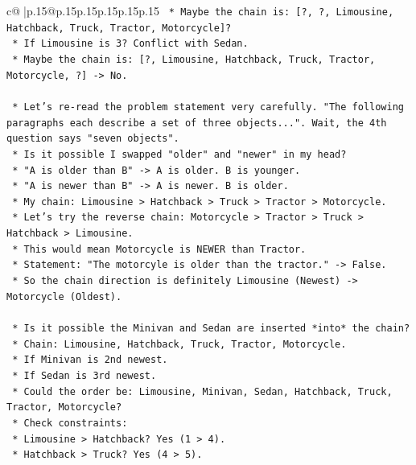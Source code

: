 \documentclass{article}
\begin{document}
{\begin{supertabular}{c@{$\;$}|p{.15\linewidth}@{}p{.15\linewidth}p{.15\linewidth}p{.15\linewidth}p{.15\linewidth}p{.15\linewidth}}
{{{\texttt{        *   Maybe the chain is: {[}?, ?, Limousine, Hatchback, Truck, Tractor, Motorcycle{]}?} \\
\texttt{            *   If Limousine is 3? Conflict with Sedan.} \\
\texttt{        *   Maybe the chain is: {[}?, Limousine, Hatchback, Truck, Tractor, Motorcycle, ?{]} {-}> No.} \\
\\ 
\texttt{    *   Let's re{-}read the problem statement very carefully. "The following paragraphs each describe a set of three objects...". Wait, the 4th question says "seven objects".} \\
\texttt{    *   Is it possible I swapped "older" and "newer" in my head?} \\
\texttt{        *   "A is older than B" {-}> A is older. B is younger.} \\
\texttt{        *   "A is newer than B" {-}> A is newer. B is older.} \\
\texttt{        *   My chain: Limousine > Hatchback > Truck > Tractor > Motorcycle.} \\
\texttt{        *   Let's try the reverse chain: Motorcycle > Tractor > Truck > Hatchback > Limousine.} \\
\texttt{            *   This would mean Motorcycle is NEWER than Tractor.} \\
\texttt{            *   Statement: "The motorcyle is older than the tractor." {-}> False.} \\
\texttt{            *   So the chain direction is definitely Limousine (Newest) {-}> Motorcycle (Oldest).} \\
\\ 
\texttt{    *   Is it possible the Minivan and Sedan are inserted *into* the chain?} \\
\texttt{        *   Chain: Limousine, Hatchback, Truck, Tractor, Motorcycle.} \\
\texttt{        *   If Minivan is 2nd newest.} \\
\texttt{        *   If Sedan is 3rd newest.} \\
\texttt{        *   Could the order be: Limousine, Minivan, Sedan, Hatchback, Truck, Tractor, Motorcycle?} \\
\texttt{            *   Check constraints:} \\
\texttt{                *   Limousine > Hatchback? Yes (1 > 4).} \\
\texttt{                *   Hatchback > Truck? Yes (4 > 5).} \\
}}}
\end{supertabular}}
\end{document}
